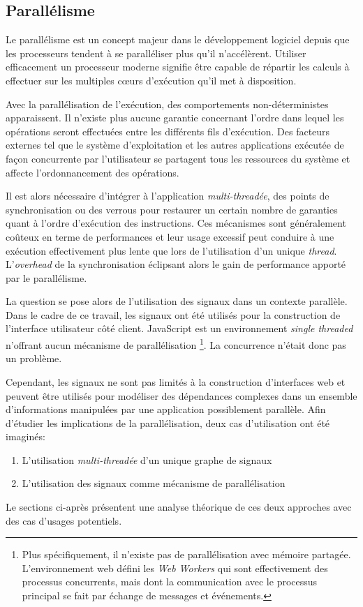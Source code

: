 \subsection{Parallélisme}

Le parallélisme est un concept majeur dans le développement logiciel depuis que les processeurs tendent à se paralléliser plus qu'il n'accélèrent. Utiliser efficacement un processeur moderne signifie être capable de répartir les calculs à effectuer sur les multiples cœurs d'exécution qu'il met à disposition.

Avec la parallélisation de l'exécution, des comportements non-déterministes apparaissent. Il n'existe plus aucune garantie concernant l'ordre dans lequel les opérations seront effectuées entre les différents fils d'exécution. Des facteurs externes tel que le système d'exploitation et les autres applications exécutée de façon concurrente par l'utilisateur se partagent tous les ressources du système et affecte l'ordonnancement des opérations.

Il est alors nécessaire d'intégrer à l'application \emph{multi-threadée}, des points de synchronisation ou des verrous pour restaurer un certain nombre de garanties quant à l'ordre d'exécution des instructions. Ces mécanismes sont généralement coûteux en terme de performances et leur usage excessif peut conduire à une exécution effectivement plus lente que lors de l'utilisation d'un unique \emph{thread}. L'\emph{overhead} de la synchronisation éclipsant alors le gain de performance apporté par le parallélisme.

La question se pose alors de l'utilisation des signaux dans un contexte parallèle. Dans le cadre de ce travail, les signaux ont été utilisés pour la construction de l'interface utilisateur côté client. JavaScript est un environnement \emph{single threaded} n'offrant aucun mécanisme de parallélisation \footnote{Plus spécifiquement, il n'existe pas de parallélisation avec mémoire partagée. L'environnement web défini les \emph{Web Workers} qui sont effectivement des processus concurrents, mais dont la communication avec le processus principal se fait par échange de messages et événements.}. La concurrence n'était donc pas un problème.

Cependant, les signaux ne sont pas limités à la construction d'interfaces web et peuvent être utilisés pour modéliser des dépendances complexes dans un ensemble d'informations manipulées par une application possiblement parallèle. Afin d'étudier les implications de la parallélisation, deux cas d'utilisation ont été imaginés:
\begin{enumerate}
	\item L'utilisation \emph{multi-threadée} d'un unique graphe de signaux
	\item L'utilisation des signaux comme mécanisme de parallélisation
\end{enumerate}
Le sections ci-après présentent une analyse théorique de ces deux approches avec des cas d'usages potentiels.

